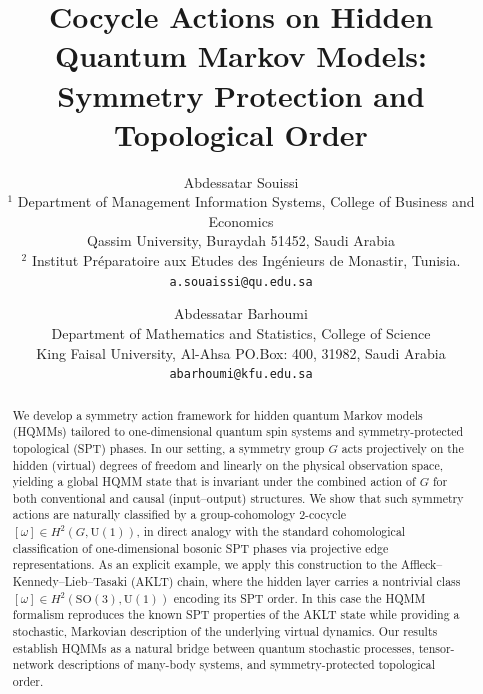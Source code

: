\documentclass[12pt,a4paper]{article}
\begin{document}
\title{Cocycle Actions on Hidden Quantum Markov Models: Symmetry Protection and Topological Order}

\author{
    Abdessatar Souissi \\
    \small $^1$ Department of Management Information Systems, College of Business and Economics \\
    \small Qassim University, Buraydah 51452, Saudi Arabia \\
\small $^2$ Institut Préparatoire aux Etudes des Ingénieurs de Monastir, Tunisia.
    \small \texttt{a.souaissi@qu.edu.sa}
    \and
    Abdessatar Barhoumi \\
    \small Department of Mathematics and Statistics, College of Science \\
    \small King Faisal University, Al-Ahsa PO.Box: 400, 31982, Saudi Arabia \\
    \small \texttt{abarhoumi@kfu.edu.sa}
}
\vskip0.5cm



\date{}
\maketitle


\begin{abstract}
We develop a symmetry action framework for hidden quantum Markov models (HQMMs) tailored to one-dimensional quantum spin systems and symmetry-protected topological (SPT) phases. In our setting, a symmetry group $G$ acts projectively on the hidden (virtual) degrees of freedom and linearly on the physical observation space, yielding a global HQMM state that is invariant under the combined action of $G$ for both conventional and causal (input--output) structures. We show that such symmetry actions are naturally classified by a group-cohomology $2$-cocycle $[\omega] \in H^{2}(G,\mathrm{U}(1))$, in direct analogy with the standard cohomological classification of one-dimensional bosonic SPT phases via projective edge representations. As an explicit example, we apply this construction to the Affleck--Kennedy--Lieb--Tasaki (AKLT) chain, where the hidden layer carries a nontrivial class $[\omega] \in H^{2}(\mathrm{SO}(3),\mathrm{U}(1))$ encoding its SPT order. In this case the HQMM formalism reproduces the known SPT properties of the AKLT state while providing a stochastic, Markovian description of the underlying virtual dynamics. Our results establish HQMMs as a natural bridge between quantum stochastic processes, tensor-network descriptions of many-body systems, and symmetry-protected topological order.
\end{abstract}
\vspace{0.3cm}
\end{document}

